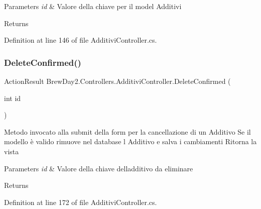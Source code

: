 \begin{DoxyParams}{Parameters}
{\em id} & Valore della chiave per il model Additivi\\
\hline
\end{DoxyParams}
\begin{DoxyReturn}{Returns}

\end{DoxyReturn}


Definition at line 146 of file Additivi\+Controller.\+cs.

\mbox{\label{class_brew_day2_1_1_controllers_1_1_additivi_controller_a039d3630deec332cf2deb548deceb6c7}} 
\subsubsection{\texorpdfstring{Delete\+Confirmed()}{DeleteConfirmed()}}
{\footnotesize\ttfamily Action\+Result Brew\+Day2.\+Controllers.\+Additivi\+Controller.\+Delete\+Confirmed (\begin{DoxyParamCaption}\item[{int}]{id }\end{DoxyParamCaption})}





Metodo invocato alla submit della form per la cancellazione di un Additivo Se il modello è valido rimuove nel database l\textquotesingle{} Additivo e salva i cambiamenti Ritorna la vista 


\begin{DoxyParams}{Parameters}
{\em id} & Valore della chiave dell\textquotesingle{}additivo da eliminare\\
\hline
\end{DoxyParams}
\begin{DoxyReturn}{Returns}

\end{DoxyReturn}


Definition at line 172 of file Additivi\+Controller.\+cs.

\mbox{\label{class_brew_day2_1_1_controllers_1_1_additivi_controller_a9fb0eab448c2b1bd33b3fdb2cd36ad55}} 
